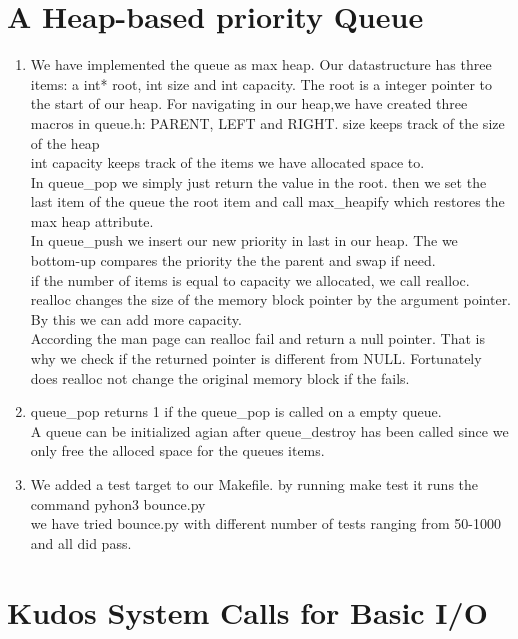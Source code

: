 \documentclass[12pt]{article}
\begin{document}
\section*{A Heap-based priority Queue}
\begin{enumerate}
  \item We have implemented the queue as max heap. Our datastructure has three items: a int* root, int size and int capacity. The root is a integer pointer to the start of our heap. For navigating in our heap,we have created three macros in queue.h: PARENT, LEFT and RIGHT.
size keeps track of the size of the heap\\
int capacity keeps track of the items we have allocated space to.\\
In queue\_pop we simply just return the value in the root. then we set the last item of the queue the root item and call max\_heapify which restores the max heap attribute.\\
In queue\_push we insert our new priority in last in our heap. The we bottom-up compares the priority the the parent and swap if need. \\
if the number of items is equal to capacity we allocated, we call realloc. realloc changes the size of the memory block pointer by the argument pointer. By this we can add more capacity.\\
According the man page can realloc fail and return a null pointer. That is why we check if the returned pointer is different from NULL. Fortunately does realloc not change the original memory block if the fails.
\item queue\_pop returns 1 if the queue\_pop is called on a empty queue.\\
A queue can be initialized agian after queue\_destroy has been called since we only free the alloced space for the queues items.
\item We added a test target to our Makefile. by running make test it runs the command pyhon3 bounce.py\\
we have tried bounce.py with different number of tests ranging from 50-1000 and all did pass.\\
\end{enumerate}
\section*{Kudos System Calls for Basic I/O}  
\end{document}
